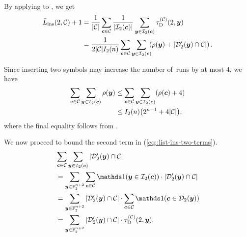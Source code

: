 \documentclass[conference, a4paper]{IEEEtran}
\begin{document}
\begin{IEEEproof}
By applying   to , we get
\begin{align}
     \bar{L}_\mathrm{ins}(2,\mathcal{C}) + 1 &= \frac{1}{|\mathcal{C}|} \sum_{{\boldsymbol c} \in \mathcal{C}} \frac{1}{|\mathcal{I}_{2}({\boldsymbol c})|} \sum_{{\boldsymbol y} \in \mathcal{I}_{2}({\boldsymbol c})} \tau_{\mathrm{D}}^{(\mathcal{C})}(2,{\boldsymbol y}) \nonumber \\
    &= \frac{1}{2|\mathcal{C}|I_2(n)} \sum_{{\boldsymbol c} \in \mathcal{C}}  \sum_{{\boldsymbol y} \in \mathcal{I}_{2}({\boldsymbol c})} \!\!\!  \left( \rho({\boldsymbol y}) 
    + |\mathcal{D}'_{2}({\boldsymbol y}) \cap \mathcal{C}| \right). \label{eq::list-ins-two-terms}
\end{align}

Since inserting two symbols may increase the number of~runs by at most $4$, we have
\begin{align}
    \sum_{\bfc \in \cC}  \sum_{\bfy \in \ballins{\bfc}{2}} \rho(\bfy) &\leq \sum_{\bfc \in \cC}  \sum_{\bfy \in \ballins{\bfc}{2}} (\rho(\bfc) + 4) \nonumber \\
    &\leq I_2(n)  \parenv*{2^{n-1} +  4|\cC|}, \label{eq::sum1}
\end{align}
where the final equality follows from .

We now proceed to bound the second term in (\ref{eq::list-ins-two-terms}).
\begin{align}
    &\sum_{\bfc \in \cC}  \sum_{\bfy \in \ballins{\bfc}{2}} |\balldelp{\bfy}{2} \cap \cC| \nonumber \\
    &= \sum_{\bfy \in \Ftwo^{n+2}} \sum_{\bfc \in \cC} \indicator(\bfy \in \ballins{\bfc}{2}) \cdot |\balldelp{\bfy}{2} \cap \cC| \nonumber \\
    &= \sum_{\bfy \in \Ftwo^{n+2}} |\balldelp{\bfy}{2} \cap \cC|  \cdot \sum_{\bfc \in \cC} \indicator(\bfc \in \balldel{\bfy}{2}) \nonumber \\
    &= \sum_{\bfy \in \Ftwo^{n+2}} |\balldelp{\bfy}{2} \cap \cC|  \cdot \tauD^{(\cC)}(2,\bfy). \nonumber
\end{align}


\end{IEEEproof}
\end{document}

